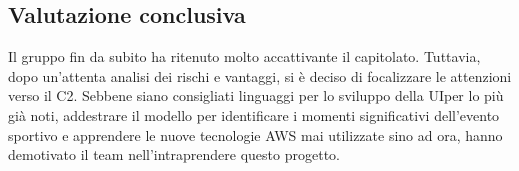 \subsection{Valutazione conclusiva}
Il gruppo fin da subito ha ritenuto molto accattivante il capitolato\glo. Tuttavia, dopo un'attenta analisi dei rischi e vantaggi, si è deciso di focalizzare le attenzioni verso il C2. Sebbene siano consigliati linguaggi per lo sviluppo della UI\glo per lo più già noti, addestrare il modello per identificare i momenti significativi dell'evento sportivo e apprendere le nuove tecnologie AWS mai utilizzate sino ad ora, hanno demotivato il team nell'intraprendere questo progetto.